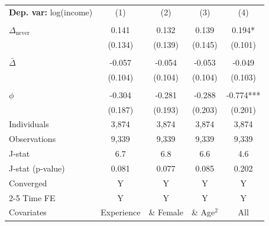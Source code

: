 \begin{tabular}{l cccc} \toprule  \textbf{Dep. var:}  log(income) 
                    &\multicolumn{1}{c}{(1)}   &\multicolumn{1}{c}{(2)}   &\multicolumn{1}{c}{(3)}   &\multicolumn{1}{c}{(4)}   \\
                    &               &               &               &               \\
\addlinespace
$\Delta_{\text{never}}$&       0.141   &       0.132   &       0.139   &       0.194*  \\
                    &     (0.134)   &     (0.139)   &     (0.145)   &     (0.101)   \\
                    &               &               &               &               \\
\addlinespace
$\bar{\Delta}$      &      -0.057   &      -0.054   &      -0.053   &      -0.049   \\
                    &     (0.104)   &     (0.104)   &     (0.104)   &     (0.103)   \\
                    &               &               &               &               \\
\addlinespace
$\phi$              &      -0.304   &      -0.281   &      -0.288   &      -0.774***\\
                    &     (0.187)   &     (0.193)   &     (0.203)   &     (0.201)   \\
\addlinespace
Individuals         &       3,874   &       3,874   &       3,874   &       3,874   \\
Observations        &       9,339   &       9,339   &       9,339   &       9,339   \\
J-stat              &         6.7   &         6.8   &         6.6   &         4.6   \\
J-stat (p-value)    &       0.081   &       0.077   &       0.085   &       0.202   \\
Converged           &           Y   &           Y   &           Y   &           Y   \\
\cmidrule{2-5} Time FE & Y & Y & Y & Y \\ Covariates & Experience & \& Female & \& Age$^2$ & All \\ \bottomrule \end{tabular}
